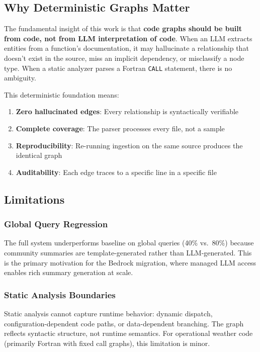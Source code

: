 \documentclass[11pt,letterpaper]{article}
\begin{document}
\subsection{Why Deterministic Graphs Matter}

The fundamental insight of this work is that \textbf{code graphs should
be built from code, not from LLM interpretation of code}. When an LLM
extracts entities from a function's documentation, it may hallucinate
a relationship that doesn't exist in the source, miss an implicit
dependency, or misclassify a node type. When a static analyzer parses
a Fortran \texttt{CALL} statement, there is no ambiguity.

This deterministic foundation means:

\begin{enumerate}[nosep]
    \item \textbf{Zero hallucinated edges}: Every relationship is
          syntactically verifiable
    \item \textbf{Complete coverage}: The parser processes every file,
          not a sample
    \item \textbf{Reproducibility}: Re-running ingestion on the same
          source produces the identical graph
    \item \textbf{Auditability}: Each edge traces to a specific line
          in a specific file
\end{enumerate}

\subsection{Limitations}

\subsubsection{Global Query Regression}

The full system underperforms baseline on global queries (40\% vs.\ 80\%)
because community summaries are template-generated rather than
LLM-generated. This is the primary motivation for the Bedrock migration,
where managed LLM access enables rich summary generation at scale.

\subsubsection{Static Analysis Boundaries}

Static analysis cannot capture runtime behavior: dynamic dispatch,
configuration-dependent code paths, or data-dependent branching. The
graph reflects syntactic structure, not runtime semantics. For
operational weather code (primarily Fortran with fixed call graphs),
this limitation is minor.
\end{document}
